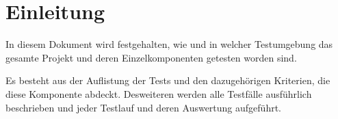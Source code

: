 

\chapter{Einleitung}
In diesem Dokument wird festgehalten, wie und in welcher Testumgebung das gesamte Projekt und deren Einzelkomponenten getesten worden sind.

Es besteht aus der Auflistung der Tests und den dazugehörigen Kriterien, die diese Komponente abdeckt. Desweiteren werden alle Testfälle ausführlich beschrieben 
und jeder Testlauf und deren Auswertung aufgeführt.